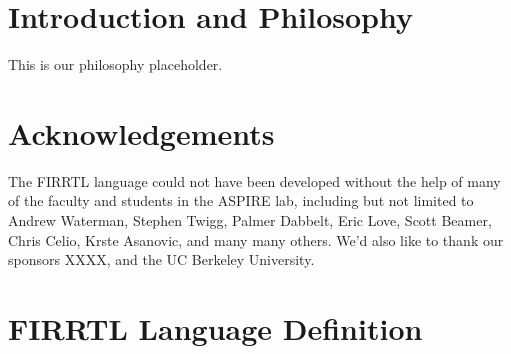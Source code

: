 \documentclass[10pt]{article}
\begin{document}
\maketitle
\tableofcontents
\newpage

\newcommand{\id}{\text{id }}
\newcommand{\ids}{\text{id}}
\newcommand{\ints}{\text{int}}
\newcommand{\intsp}{\text{int }}
\newcommand{\kw}[1]{\text{\bf #1\ }}
\newcommand{\kws}[1]{\text{\bf #1}}
\newcommand{\pd}[1]{\text{\em #1\ }}
\newcommand{\pds}[1]{\text{\em #1}}
\newcommand{\bundleT}[1]{\{#1\}}
\newcommand{\info}{[\pds{info}]\ }

\section{Introduction and Philosophy}

This is our philosophy placeholder.

\section{Acknowledgements}

The FIRRTL language could not have been developed without the help of many of the faculty and students in the ASPIRE lab, including but not limited to Andrew Waterman, Stephen Twigg, Palmer Dabbelt, Eric Love, Scott Beamer, Chris Celio, Krste Asanovic, and many many others. We'd also like to thank our sponsors XXXX, and the UC Berkeley University.

\section{FIRRTL Language Definition}
\end{document}
